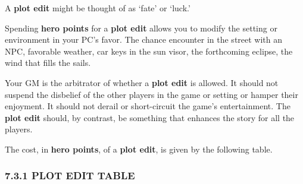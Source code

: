 \documentclass[
]{article}
\begin{document}
A \textbf{plot edit} might be thought of as `fate' or `luck.'

Spending \textbf{hero points} for a \textbf{plot edit} allows you to
modify the setting or environment in your PC's favor. The chance
encounter in the street with an NPC, favorable weather, car keys in the
sun visor, the forthcoming eclipse, the wind that fills the sails.

Your GM is the arbitrator of whether a \textbf{plot edit} is allowed. It
should not suspend the disbelief of the other players in the game or
setting or hamper their enjoyment. It should not derail or short-circuit
the game's entertainment. The \textbf{plot edit} should, by contrast, be
something that enhances the story for all the players.

The cost, in \textbf{hero points}, of a \textbf{plot edit}, is given by
the following table.

\hypertarget{plot-edit-table}{%
\subsubsection{7.3.1 PLOT EDIT TABLE}\label{plot-edit-table}}
\end{document}
